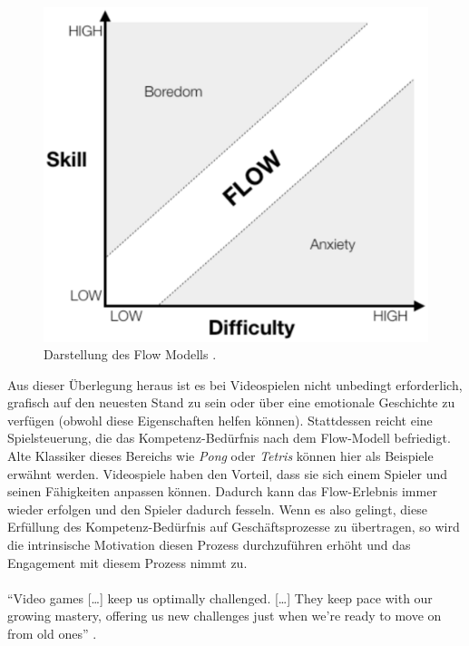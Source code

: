 \documentclass[a4paper,12pt]{scrartcl}
\begin{document}
\begin{figure}[h!]
\begin{center}
\includegraphics[scale = 0.6]{Bilder/FlowModel.eps}
\caption{Darstellung des Flow Modells \cite{FlowModel}.}
\label{FlowModelBild}
\end{center}
\end{figure}
Aus dieser Überlegung heraus ist es bei Videospielen nicht unbedingt erforderlich, grafisch auf den neuesten Stand zu sein oder über eine emotionale Geschichte zu verfügen (obwohl diese Eigenschaften helfen können). Stattdessen reicht eine Spielsteuerung, die das Kompetenz-Bedürfnis nach dem Flow-Modell befriedigt. Alte Klassiker dieses Bereichs wie \textit{Pong} oder \textit{Tetris} können hier als Beispiele erwähnt werden. Videospiele haben den Vorteil, dass sie sich einem Spieler und seinen Fähigkeiten anpassen können. Dadurch kann das Flow-Erlebnis immer wieder erfolgen und den Spieler dadurch fesseln. Wenn es also gelingt, diese Erfüllung des Kompetenz-Bedürfnis auf Geschäftsprozesse zu übertragen, so wird die intrinsische Motivation diesen Prozess durchzuführen erhöht und das Engagement mit diesem Prozess nimmt zu.
\\\\ 
\enquote{Video games […] keep us optimally challenged. […] They keep pace with our growing mastery, offering us new challenges just when we’re ready to move on from old ones} \cite{Rigby2011}.
\\\\
\end{document}

